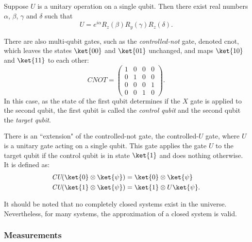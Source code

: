 \begin{theorem} \label{unitary} \cite{nielsen2010quantum}
  Suppose $U$ is a unitary operation on a single qubit. Then there exist real numbers $\alpha$, $\beta$, $\gamma$ and $\delta$ such that
  \begin{equation*}
    U = e^{i\alpha} R_{z}(\beta) R_{y}(\gamma) R_{z}(\delta).
  \end{equation*}
\end{theorem}

\begin{example}
  
There are also multi-qubit gates, such as the \emph{controlled-not} gate, denoted \gls{cnot}, which leaves the states $\ket{00}$ and  $\ket{01}$ unchanged, and maps $\ket{10}$ and $\ket{11}$ to each other:
\begin{equation*}
  \textit{CNOT} = \begin{pmatrix} 1 & 0 & 0 & 0\\ 0 & 1 & 0 & 0\\ 0 & 0 & 0 & 1\\ 0 & 0 & 1 & 0 \end{pmatrix}.
\end{equation*}
In this case, as the state of the first qubit determines if the $X$ gate is applied to the second qubit, the first qubit is called the \emph{control qubit} and the second qubit the \emph{target qubit}. 

There is an ``extension" of the controlled-not gate, the controlled-$U$ gate, where $U$ is a unitary gate acting on a single qubit. This gate applies the gate $U$ to the target qubit if the control qubit is in state $\ket{1}$ and does nothing otherwise. It is defined as:
\begin{align*}
  &\textit{CU} (\ket{0} \otimes \ket{\psi}) = \ket{0} \otimes \ket{\psi}\\ 
  &\textit{CU} (\ket{1} \otimes \ket{\psi}) = \ket{1} \otimes U\ket{\psi}.
\end{align*}
\end{example}

It should be noted that no completely closed systems exist in the universe. Nevertheless, for many systems, the approximation of a closed system is valid.



\subsubsection{Measurements}

